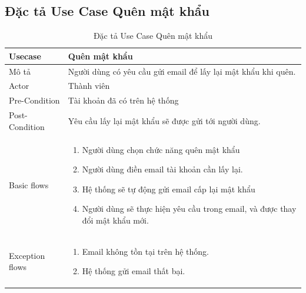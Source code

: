 \documentclass[../index.tex]{subfiles}
\begin{document}
    \subsection{Đặc tả Use Case Quên mật khẩu}
    \begin{table}[H]
        \centering
        {}
        \begin{tabular}{ |p{3cm}|p{9cm}| }
            \hline
            Usecase         & Quên mật khẩu                                                                                   \\
            \hline
            Mô tả           & Người dùng có yêu cầu gửi email để lấy lại mật khẩu khi quên.        \\
            \hline
            Actor           & Thành viên                                                                                  \\
            \hline
            Pre-Condition   & Tài khoản đã có trên hệ thống                                                               \\
            \hline
            Post-Condition  & Yêu cầu lấy lại mật khẩu sẽ được gửi tới người dùng.                                                \\
            \hline
            Basic flows     & \begin{enumerate}
                \item Người dùng chọn chức năng quên mật khẩu
                \item Người dùng điền email tài khoản cần lấy lại.
                \item Hệ thống sẽ tự động gửi email cấp lại mật khẩu
                \item Người dùng sẽ thực hiện yêu cầu trong email, và được thay đổi mật khẩu mới.
            \end{enumerate} \\
            \hline
            Exception flows     & \begin{enumerate}
                \item Email không tồn tại trên hệ thống.
                \item Hệ thống gửi email thất bại.
            \end{enumerate} \\
            \hline
        \end{tabular}
        \caption{Đặc tả Use Case Quên mật khẩu}
    \end{table}
\end{document}
